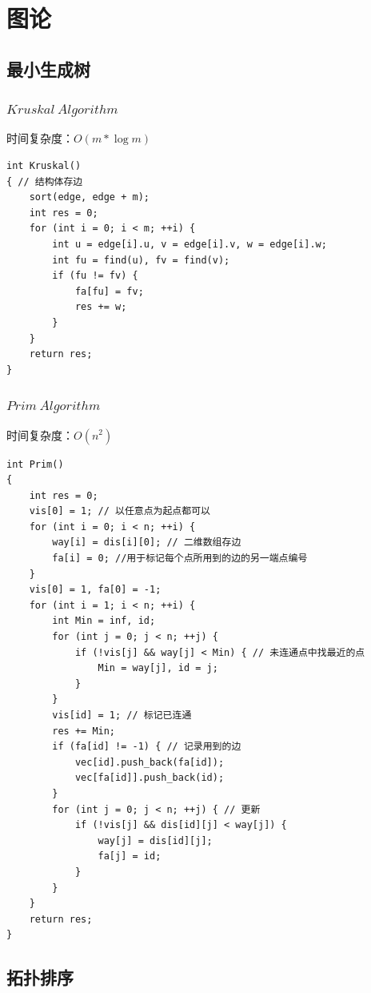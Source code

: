 %
%

\chapter{图论}

\section{最小生成树}

\subsection{$Kruskal\ Algorithm$}
时间复杂度：$O(m*\log m)$
\begin{lstlisting}
int Kruskal()
{ // 结构体存边
	sort(edge, edge + m);
	int res = 0;
	for (int i = 0; i < m; ++i) {
		int u = edge[i].u, v = edge[i].v, w = edge[i].w;
		int fu = find(u), fv = find(v);
		if (fu != fv) {
			fa[fu] = fv;
			res += w;
		}
	}
	return res;
}
\end{lstlisting}

\subsection{$Prim\ Algorithm$}
时间复杂度：$O(n^2)$

\begin{lstlisting}
int Prim()
{
	int res = 0;
	vis[0] = 1; // 以任意点为起点都可以
	for (int i = 0; i < n; ++i) {
		way[i] = dis[i][0]; // 二维数组存边
		fa[i] = 0; //用于标记每个点所用到的边的另一端点编号
	}
	vis[0] = 1, fa[0] = -1;
	for (int i = 1; i < n; ++i) {
		int Min = inf, id;
		for (int j = 0; j < n; ++j) {
			if (!vis[j] && way[j] < Min) { // 未连通点中找最近的点
				Min = way[j], id = j;
			}
		}
		vis[id] = 1; // 标记已连通
		res += Min;
		if (fa[id] != -1) { // 记录用到的边
			vec[id].push_back(fa[id]);
			vec[fa[id]].push_back(id);
		}
		for (int j = 0; j < n; ++j) { // 更新
			if (!vis[j] && dis[id][j] < way[j]) {
				way[j] = dis[id][j];
				fa[j] = id;
			}
		}
	}
	return res;
}
\end{lstlisting}

\clearpage
\section{拓扑排序}

